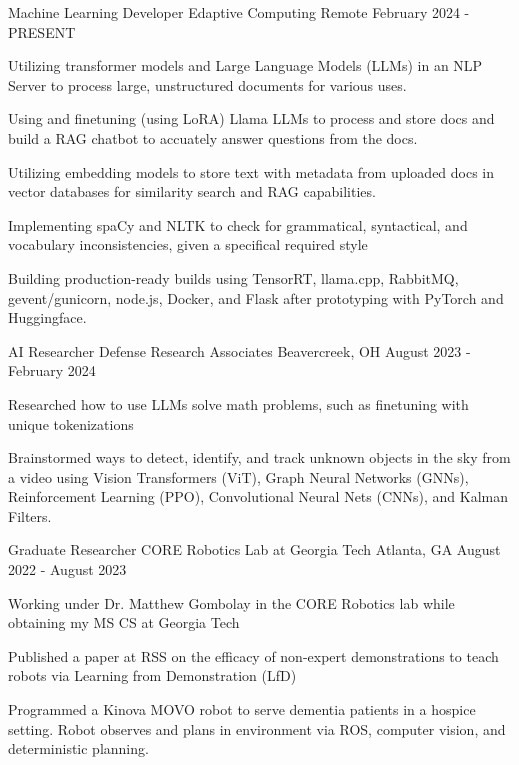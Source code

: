 
\begin{cventries}

\cventry
    {Machine Learning Developer} %
    {Edaptive Computing} %
    {Remote} %
    {February 2024 - PRESENT} %
    {
      \begin{cvitems} %
        \item {Utilizing transformer models and Large Language Models (LLMs) in an NLP Server to process large, unstructured documents for various uses.}
        \item {Using and finetuning (using LoRA) Llama LLMs to process and store docs and build a RAG chatbot to accuately answer questions from the docs.}
        \item {Utilizing embedding models to store text with metadata from uploaded docs in vector databases for similarity search and RAG capabilities.}
        \item {Implementing spaCy and NLTK to check for grammatical, syntactical, and vocabulary inconsistencies, given a specifical required style}
        \item {Building production-ready builds using TensorRT, llama.cpp, RabbitMQ, gevent/gunicorn, node.js, Docker, and Flask after prototyping with PyTorch and Huggingface.}
      \end{cvitems}
    }
    
\cventry
    {AI Researcher} %
    {Defense Research Associates} %
    {Beavercreek, OH} %
    {August 2023 - February 2024} %
    {
      \begin{cvitems} %
        \item {Researched how to use LLMs solve math problems, such as finetuning with unique tokenizations}
        \item {Brainstormed ways to detect, identify, and track unknown objects in the sky from a video using Vision Transformers (ViT), Graph Neural Networks (GNNs), Reinforcement Learning (PPO), Convolutional Neural Nets (CNNs), and Kalman Filters.}
      \end{cvitems}
    }

\cventry
    {Graduate Researcher} %
    {CORE Robotics Lab at Georgia Tech} %
    {Atlanta, GA} %
    {August 2022 - August 2023} %
    {
      \begin{cvitems} %
        \item {Working under Dr. Matthew Gombolay in the CORE Robotics lab while obtaining my MS CS at Georgia Tech}
        \item {Published a paper at RSS on the efficacy of non-expert demonstrations to teach robots via Learning from Demonstration (LfD)}
        \item {Programmed a Kinova MOVO robot to serve dementia patients in a hospice setting. Robot observes and plans in environment via ROS, computer vision, and deterministic planning.}
      \end{cvitems}
    }


\end{cventries}
